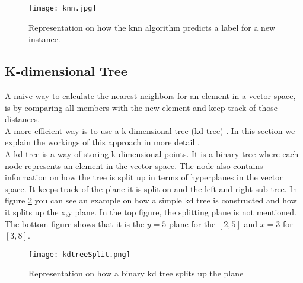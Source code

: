 \begin{figure}[!htb]
	\centering
	\texttt{[image: knn.jpg]}
	\caption{Representation on how the knn algorithm predicts a label for a new instance.}
	\label{fig:knn}
\end{figure}
	
	
	\subsection{K-dimensional Tree}
	\label{sec:kdtree}
	
A naive way to calculate the nearest neighbors for an element in a vector space, is by comparing all members with the new element and keep track of those distances. \\
A more efficient way is to use a k-dimensional tree (kd tree) \cite{kdtree:article}. In this section we explain the workings of this approach in more detail \cite{kdtreeIntro:atricle}. \\

A kd tree is a way of storing k-dimensional points. It is a binary tree where each node represents an element in the vector space. The node also contains information on how the tree is split up in terms of hyperplanes in the vector space. It keeps track of the plane it is split on and the left and right sub tree. In figure \ref{fig:kdtreeSplit} you can see an example on how a simple kd tree is constructed and how it splits up the x,y plane. In the top figure, the splitting plane is not mentioned. The bottom figure shows that it is the $y=5$ plane for the $[2,5]$ and $x=3$ for $[3,8]$. \\
	
\begin{figure}[!htb]
	\centering
	\texttt{[image: kdtreeSplit.png]}
	\caption{Representation on how a binary kd tree splits up the plane  \cite{kdtreeIntro:atricle}}
	\label{fig:kdtreeSplit}
\end{figure}


